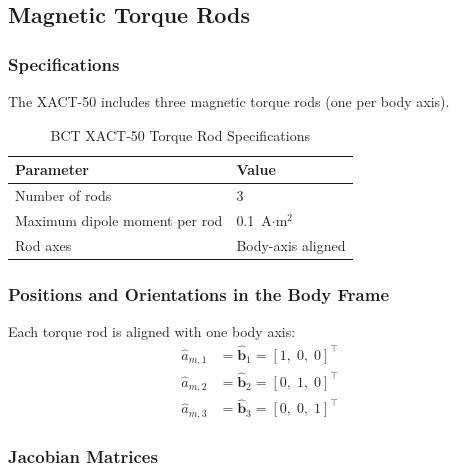\subsection{Magnetic Torque Rods}

\subsubsection{Specifications}

The XACT-50 includes three magnetic torque rods (one per body axis).

\begin{table}[H]
\centering
\caption{BCT XACT-50 Torque Rod Specifications \cite{BCT_HEGEL2018}}
\label{tab:mt_specs}
\begin{tabular}{ll}
\hline
\textbf{Parameter} & \textbf{Value} \\
\hline
Number of rods                & 3 \\
Maximum dipole moment per rod & 0.1~A$\cdot$m$^2$ \\
Rod axes                      & Body-axis aligned \\
\hline
\end{tabular}
\end{table}

\subsubsection{Positions and Orientations in the Body Frame}

Each torque rod is aligned with one body axis:
\begin{align*}
    \hat{a}_{m,1} &= \hat{\mathbf{b}}_1 = [1,\;0,\;0]^\top \\
    \hat{a}_{m,2} &= \hat{\mathbf{b}}_2 = [0,\;1,\;0]^\top \\
    \hat{a}_{m,3} &= \hat{\mathbf{b}}_3 = [0,\;0,\;1]^\top
\end{align*}

\subsubsection{Jacobian Matrices}

